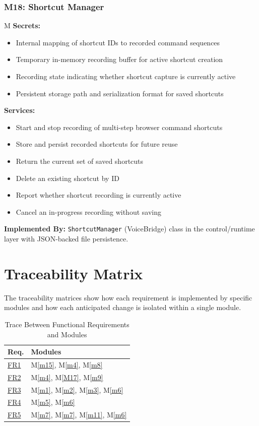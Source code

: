 \documentclass[12pt, titlepage]{article}
\newcounter{mnum}
\newcommand{\mthemnum}{M\themnum}
\newcommand{\mref}[1]{M\ref{#1}}
\begin{document}
\subsubsection*{M18: Shortcut Manager} \mthemnum\label{M18}
\textbf{Secrets:} 
\begin{itemize}
  \item Internal mapping of shortcut IDs to recorded command sequences
  \item Temporary in-memory recording buffer for active shortcut creation
  \item Recording state indicating whether shortcut capture is currently active
  \item Persistent storage path and serialization format for saved shortcuts
\end{itemize}
\textbf{Services:} 
\begin{itemize}
  \item Start and stop recording of multi-step browser command shortcuts
  \item Store and persist recorded shortcuts for future reuse
  \item Return the current set of saved shortcuts
  \item Delete an existing shortcut by ID
  \item Report whether shortcut recording is currently active
  \item Cancel an in-progress recording without saving
\end{itemize}
\textbf{Implemented By:} \texttt{ShortcutManager} (VoiceBridge) class in the control/runtime layer with JSON-backed file persistence.

\section{Traceability Matrix} \label{SecTM}

The traceability matrices show how each requirement is
implemented by specific modules and how each anticipated change is isolated
within a single module.

\begin{table}[H]
\centering
\begin{tabular}{p{} p{}}
\toprule
\textbf{Req.} & \textbf{Modules}\\
\midrule
\hyperref[fr:FR1]{FR1} & \mref{m15}, \mref{m4}, \mref{m8}\\
\hyperref[fr:FR2]{FR2} & \mref{m4}, \mref{M17}, \mref{m9}\\
\hyperref[fr:FR3]{FR3} & \mref{m1}, \mref{m2}, \mref{m3}, \mref{m6}\\
\hyperref[fr:FR4]{FR4} & \mref{m5}, \mref{m6}\\
\hyperref[fr:FR5]{FR5} & \mref{m7}, \mref{m7}, \mref{m11}, \mref{m6}\\
\bottomrule
\end{tabular}
\caption{Trace Between Functional Requirements and Modules}
\label{TblRTFunctional}
\end{table}
\end{document}

